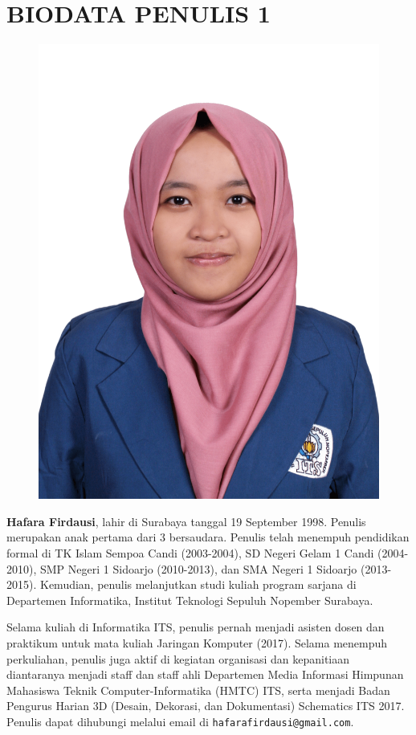\newpage
	\chapter{BIODATA PENULIS 1}
	\begin{figure}
	\includegraphics[height=0.3\textheight]{biodata/img/foto-hf.png}
	\end{figure}
	
	\textbf{Hafara Firdausi}, lahir di Surabaya tanggal 19 September 1998. Penulis merupakan anak pertama dari 3 bersaudara. Penulis telah menempuh pendidikan formal di TK Islam Sempoa Candi (2003-2004), SD Negeri Gelam 1 Candi (2004-2010), SMP Negeri 1 Sidoarjo (2010-2013), dan SMA Negeri 1 Sidoarjo (2013-2015). Kemudian, penulis melanjutkan studi kuliah program sarjana di Departemen Informatika, Institut Teknologi Sepuluh Nopember Surabaya. 
	
	Selama kuliah di Informatika ITS, penulis pernah menjadi asisten dosen dan praktikum untuk mata kuliah Jaringan Komputer (2017). Selama menempuh perkuliahan, penulis juga aktif di kegiatan organisasi dan kepanitiaan diantaranya menjadi staff dan staff ahli Departemen Media Informasi Himpunan Mahasiswa Teknik Computer-Informatika (HMTC) ITS, serta menjadi Badan Pengurus Harian 3D (Desain, Dekorasi, dan Dokumentasi) Schematics ITS 2017. Penulis dapat dihubungi melalui email di  \texttt{hafarafirdausi@gmail.com}.

